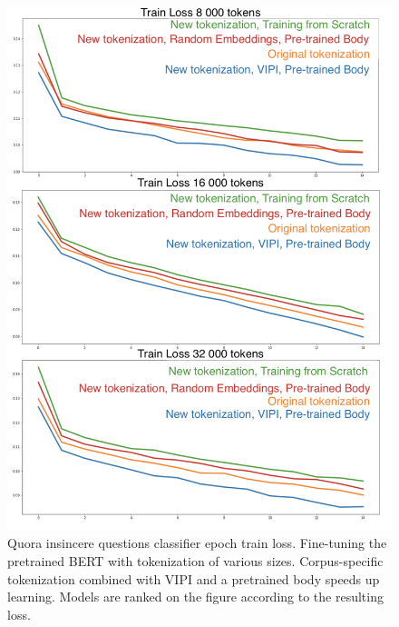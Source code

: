 \documentclass[review]{elsarticle}
\begin{document}
\begin{figure}
\begin{multicols}{2}
    \includegraphics[scale=0.3]{Qex.png}
  \caption{Quora insincere questions classifier epoch train loss. Fine-tuning the pretrained BERT with tokenization of various sizes. Corpus-specific tokenization combined with VIPI and a pretrained body speeds up learning. Models are ranked on the figure according to the resulting loss.}
  \label{fig:Q}

\end{multicols}
\end{figure}
\end{document}

